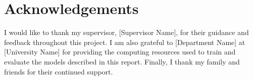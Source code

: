 \chapter*{Acknowledgements}

I would like to thank my supervisor, [Supervisor Name], for their guidance and feedback throughout this project. I am also grateful to [Department Name] at [University Name] for providing the computing resources used to train and evaluate the models described in this report. Finally, I thank my family and friends for their continued support.


